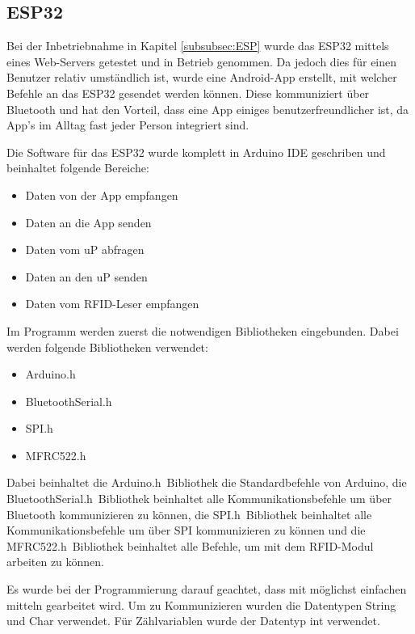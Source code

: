 \subsection{ESP32}
\label{subsec:Software_ESP32}

Bei der Inbetriebnahme in Kapitel \ref{subsubsec:ESP} wurde das ESP32 mittels eines Web-Servers getestet und in Betrieb genommen. Da jedoch dies für einen Benutzer relativ umständlich ist, wurde eine Android-App erstellt, mit welcher Befehle an das ESP32 gesendet werden können. Diese kommuniziert über Bluetooth und hat den Vorteil, dass eine App einiges benutzerfreundlicher ist, da App's im Alltag fast jeder Person integriert sind. \cite{santos_esp32_2018}  

Die Software für das ESP32 wurde komplett in Arduino IDE geschriben und beinhaltet folgende Bereiche:

\begin{itemize}
\item Daten von der App empfangen
\item Daten an die App senden
\item Daten vom uP abfragen
\item Daten an den uP senden 
\item Daten vom RFID-Leser empfangen
\end{itemize}

Im Programm werden zuerst die notwendigen Bibliotheken  eingebunden. Dabei werden folgende Bibliotheken verwendet:

\begin{itemize}
\item Arduino.h
\item BluetoothSerial.h
\item SPI.h
\item MFRC522.h
\end{itemize}

Dabei beinhaltet die \flqq Arduino.h\frqq~Bibliothek die Standardbefehle von Arduino, die \flqq BluetoothSerial.h\frqq~Bibliothek beinhaltet alle Kommunikationsbefehle um über Bluetooth kommunizieren zu können, die \flqq SPI.h\frqq~Bibliothek beinhaltet alle Kommunikationsbefehle um über SPI kommunizieren zu können und die \flqq MFRC522.h\frqq~Bibliothek beinhaltet alle Befehle, um mit dem RFID-Modul arbeiten zu können.

Es wurde bei der Programmierung darauf geachtet, dass mit möglichst einfachen mitteln gearbeitet wird. Um zu Kommunizieren wurden die Datentypen String und Char verwendet. Für Zählvariablen wurde der Datentyp int verwendet. 